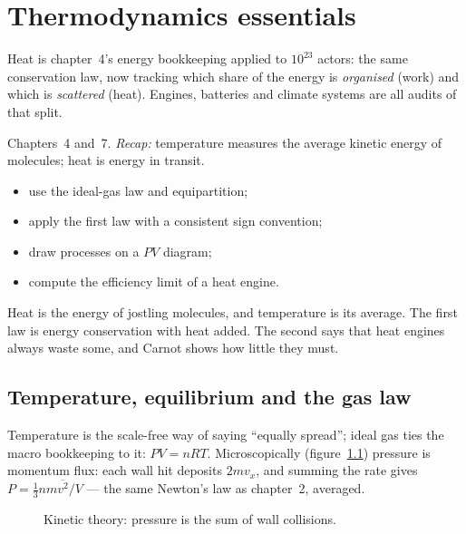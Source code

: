 \chapter{Thermodynamics essentials}\label{ch:thermo}

Heat is chapter~4's energy bookkeeping applied to $10^{23}$ actors:
the same conservation law, now tracking which share of the energy is
\emph{organised} (work) and which is \emph{scattered} (heat). Engines,
batteries and climate systems are all audits of that split.

\begin{rulebox}
Chapters~4 and~7. \emph{Recap:} temperature measures the average kinetic energy of molecules; heat is energy in transit.
\end{rulebox}
\begin{wins}
\begin{itemize}
\item use the ideal-gas law and equipartition;
\item apply the first law with a consistent sign convention;
\item draw processes on a $PV$ diagram;
\item compute the efficiency limit of a heat engine.
\end{itemize}
\end{wins}
\begin{principle}
Heat is the energy of jostling molecules, and temperature is its average. The first law is energy conservation with heat added. The second says that heat engines always waste some, and Carnot shows how little they must.
\end{principle}

\section{Temperature, equilibrium and the gas law}\label{sec:th-gas}

Temperature is the scale-free way of saying ``equally spread''; ideal
gas ties the macro bookkeeping to it: $PV=nRT$. Microscopically
(figure~\ref{fig:wall}) pressure is momentum flux: each wall hit
deposits $2mv_x$, and summing the rate gives
$P=\tfrac{1}{3}nm\overline{v^{2}}/V$ --- the same Newton's law as
chapter~2, averaged.

\begin{figure}[htbp]\centering

\caption{Kinetic theory: pressure is the sum of wall collisions.}
\label{fig:wall}
\end{figure}

